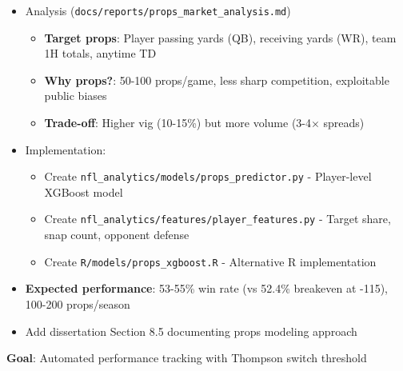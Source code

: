 \begin{itemize}
  \item {} Analysis (\texttt{docs/reports/props\_market\_analysis.md})
  \begin{itemize}
    \item \textbf{Target props}: Player passing yards (QB), receiving yards (WR), team 1H totals, anytime TD
    \item \textbf{Why props?}: 50-100 props/game, less sharp competition, exploitable public biases
    \item \textbf{Trade-off}: Higher vig (10-15\%) but more volume (3-4$\times$ spreads)
  \end{itemize}
  \item {} Implementation:
  \begin{itemize}
    \item Create \texttt{nfl\_analytics/models/props\_predictor.py} - Player-level XGBoost model
    \item Create \texttt{nfl\_analytics/features/player\_features.py} - Target share, snap count, opponent defense
    \item Create \texttt{R/models/props\_xgboost.R} - Alternative R implementation
  \end{itemize}
  \item {} \textbf{Expected performance}: 53-55\% win rate (vs 52.4\% breakeven at -115), 100-200 props/season
  \item {} Add dissertation Section 8.5 documenting props modeling approach
\end{itemize}

\textbf{Goal}: Automated performance tracking with Thompson switch threshold

